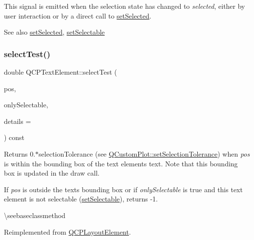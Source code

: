 This signal is emitted when the selection state has changed to {\itshape selected}, either by user interaction or by a direct call to \mbox{\hyperlink{class_q_c_p_text_element_aba5521f9fb22a5f3d2f09ab37d4a1751}{set\+Selected}}.

\begin{DoxySeeAlso}{See also}
\mbox{\hyperlink{class_q_c_p_text_element_aba5521f9fb22a5f3d2f09ab37d4a1751}{set\+Selected}}, \mbox{\hyperlink{class_q_c_p_text_element_a3c5f9b1897a036b16495ed3fb8371c55}{set\+Selectable}} 
\end{DoxySeeAlso}
\mbox{\label{class_q_c_p_text_element_a1e721bc2994a127ef5a8f0a514a5dbac}} 
\subsubsection{\texorpdfstring{selectTest()}{selectTest()}}
{\footnotesize\ttfamily double Q\+C\+P\+Text\+Element\+::select\+Test (\begin{DoxyParamCaption}\item[{const Q\+PointF \&}]{pos,  }\item[{bool}]{only\+Selectable,  }\item[{Q\+Variant $\ast$}]{details = {} }\end{DoxyParamCaption}) const\hspace{0.3cm}{\ttfamily [virtual]}}

Returns 0.$\ast$selection\+Tolerance (see \mbox{\hyperlink{class_q_custom_plot_a4dc31241d7b09680950e19e5f971ed93}{Q\+Custom\+Plot\+::set\+Selection\+Tolerance}}) when {\itshape pos} is within the bounding box of the text element\textquotesingle{}s text. Note that this bounding box is updated in the draw call.

If {\itshape pos} is outside the text\textquotesingle{}s bounding box or if {\itshape only\+Selectable} is true and this text element is not selectable (\mbox{\hyperlink{class_q_c_p_text_element_a3c5f9b1897a036b16495ed3fb8371c55}{set\+Selectable}}), returns -\/1.

\textbackslash{}seebaseclassmethod 

Reimplemented from \mbox{\hyperlink{class_q_c_p_layout_element_ae97f483cccedadbf18ea4525ef240ee4}{Q\+C\+P\+Layout\+Element}}.

\mbox{\label{class_q_c_p_text_element_a09b3241769528fa87cb4bf35c97defad}} 
